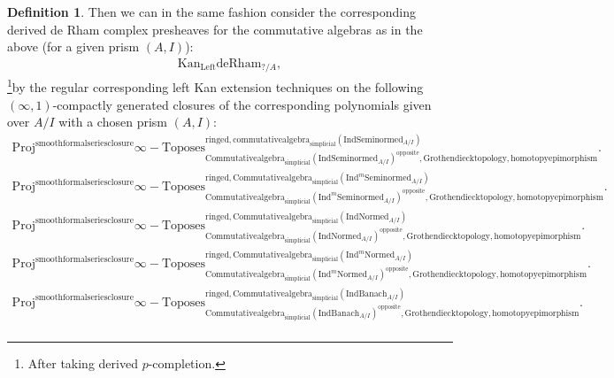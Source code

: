 \documentclass[11pt]{book}
\theoremstyle{definition}
\newtheorem{definition}[theorem]{Definition}
\numberwithin{equation}{section}
\begin{document}
\begin{definition}
Then we can in the same fashion consider the corresponding derived de Rham complex presheaves for the commutative algebras as in the above (for a given prism $(A,I)$):
\begin{align}
\mathrm{Kan}_{\mathrm{Left}}\mathrm{deRham}_{?/A},	
\end{align}
\footnote{After taking derived $p$-completion.}by the regular corresponding left Kan extension techniques on the following $(\infty,1)$-compactly generated closures of the corresponding polynomials given over $A/I$ with a chosen prism $(A,I)$:\\

\begin{align}
\mathrm{Proj}^\text{smoothformalseriesclosure}\infty-\mathrm{Toposes}^{\mathrm{ringed},\mathrm{commutativealgebra}_{\mathrm{simplicial}}(\mathrm{Ind}\mathrm{Seminormed}_{A/I})}_{\mathrm{Commutativealgebra}_{\mathrm{simplicial}}(\mathrm{Ind}\mathrm{Seminormed}_{A/I})^\mathrm{opposite},\mathrm{Grothendiecktopology,homotopyepimorphism}}. \\
\mathrm{Proj}^\text{smoothformalseriesclosure}\infty-\mathrm{Toposes}^{\mathrm{ringed},\mathrm{Commutativealgebra}_{\mathrm{simplicial}}(\mathrm{Ind}^m\mathrm{Seminormed}_{A/I})}_{\mathrm{Commutativealgebra}_{\mathrm{simplicial}}(\mathrm{Ind}^m\mathrm{Seminormed}_{A/I})^\mathrm{opposite},\mathrm{Grothendiecktopology,homotopyepimorphism}}.\\
\mathrm{Proj}^\text{smoothformalseriesclosure}\infty-\mathrm{Toposes}^{\mathrm{ringed},\mathrm{Commutativealgebra}_{\mathrm{simplicial}}(\mathrm{Ind}\mathrm{Normed}_{A/I})}_{\mathrm{Commutativealgebra}_{\mathrm{simplicial}}(\mathrm{Ind}\mathrm{Normed}_{A/I})^\mathrm{opposite},\mathrm{Grothendiecktopology,homotopyepimorphism}}.\\
\mathrm{Proj}^\text{smoothformalseriesclosure}\infty-\mathrm{Toposes}^{\mathrm{ringed},\mathrm{Commutativealgebra}_{\mathrm{simplicial}}(\mathrm{Ind}^m\mathrm{Normed}_{A/I})}_{\mathrm{Commutativealgebra}_{\mathrm{simplicial}}(\mathrm{Ind}^m\mathrm{Normed}_{A/I})^\mathrm{opposite},\mathrm{Grothendiecktopology,homotopyepimorphism}}.\\
\mathrm{Proj}^\text{smoothformalseriesclosure}\infty-\mathrm{Toposes}^{\mathrm{ringed},\mathrm{Commutativealgebra}_{\mathrm{simplicial}}(\mathrm{Ind}\mathrm{Banach}_{A/I})}_{\mathrm{Commutativealgebra}_{\mathrm{simplicial}}(\mathrm{Ind}\mathrm{Banach}_{A/I})^\mathrm{opposite},\mathrm{Grothendiecktopology,homotopyepimorphism}}.\\

\end{align}
\end{definition}
\end{document}

